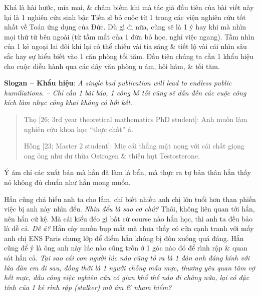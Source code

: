 \documentclass[12pt]{article}
\begin{document}
Khá là hài hước, mỉa mai, \& châm biếm khi mà tác giả đầu tiên của bài viết này lại là 1 nghiên cứu sinh bậc Tiến sĩ bỏ cuộc từ 1 trong các viện nghiên cứu tốt nhất về Toán ứng dụng của Đức. Dù gì đi nữa, cũng sẽ là 1 ý hay khi mà nhìn mọi thứ từ bên ngoài (từ tầm mắt của 1 đứa bỏ học, nghỉ việc ngang). Tầm nhìn của 1 kẻ ngoại lai đôi khi lại có thể chiếu vài tia sáng \& tiết lộ vài cái nhìn sâu sắc hay sự hiểu biết vào 1 căn phòng tối tăm. Đầu tiên chúng ta cần 1 khẩu hiệu cho cuộc diễu hành qua các dãy văn phòng u ám, hôi hám, \& tối tăm.

\vspace{2mm}
\noindent\textsf{\textbf{Slogan -- Khẩu hiệu}}: {\it A single bad publication will lead to endless public humiliations. -- Chỉ cần 1 bài báo, 1 công bố tồi cũng sẽ dẫn đến các cuộc công kích làm nhục công khai không có hồi kết}.

\begin{quote}
	{\sf Thọ [26; 3rd year theoretical mathematics PhD student]}: Anh muốn làm nghiên cứu khoa học ``thực chất'' á.
	
	{\sf Hồng [23; Master 2 student]}: Miẹ cái thằng mặt nọng với cái chất giọng ong ỏng như dư thừa Ostrogen \& thiếu hụt Testosterone.
\end{quote}
Ý ám chỉ các xuất bản mà hắn đã làm là bẩn, mà thực ra tự bản thân hắn thấy nó không đủ chuẩn như hắn mong muốn.

Hắn cũng chả hiểu anh ta cho lắm, chỉ biết nhiều anh chị lớn tuổi hơn than phiền việc bị anh này nhìn đểu. {\it Nhìn đểu là sao cơ chứ?} Thôi, không liên quan tới hắn, nên hắn cứ kệ. Mà cái kiểu đéo gì bất cứ course nào hắn học, thì anh ta đều bảo là dễ cả. {\it Dễ á?} Hắn cày muốn bụp mắt mà chưa thấy có cửa cạnh tranh với mấy anh chị ENS Paris chung lớp để điểm hắn không bị đôn xuống quá đáng. Hắn cũng để ý là ông anh này lúc nào cũng trốn ở 1 góc nào đó để rình rập \& quan sát hắn cả. {\it Tại sao cái con người lúc nào cũng tỏ ra là 1 đàn anh đáng kính với lứa đàn em đi sau, đồng thời là 1 người chồng mẫu mực, thương yêu quan tâm vợ hết mực, dẫu công việc nghiên cứu có gian khổ thế nào đi chăng nữa, lại có đặc tính của 1 kẻ rình rập (stalker) mờ ám \& nham hiểm?}
\end{document}
